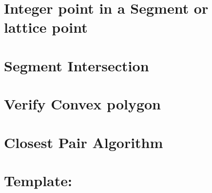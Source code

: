 \documentclass[11pt]{report}
\begin{document}
\section{Integer point in a Segment or lattice point}

\section{Segment Intersection}

\section{Verify Convex polygon}

\section{Closest Pair Algorithm}

\newpage
\section{Template: }

\end{document}
